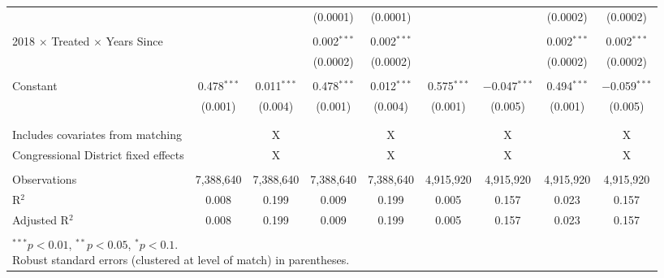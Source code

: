 \begin{table}[H]
{\begin{tabular}{@{\extracolsep{5pt}}lcccccccc}
&  &  & (0.0001) & (0.0001) &  &  & (0.0002) & (0.0002) \\
& & & & & & & & \\
2018 $\times$ Treated $\times$ Years Since &  &  & 0.002$^{***}$ & 0.002$^{***}$ &  &  & 0.002$^{***}$ & 0.002$^{***}$ \\
&  &  & (0.0002) & (0.0002) &  &  & (0.0002) & (0.0002) \\
& & & & & & & & \\
Constant & 0.478$^{***}$ & 0.011$^{***}$ & 0.478$^{***}$ & 0.012$^{***}$ & 0.575$^{***}$ & $-$0.047$^{***}$ & 0.494$^{***}$ & $-$0.059$^{***}$ \\
& (0.001) & (0.004) & (0.001) & (0.004) & (0.001) & (0.005) & (0.001) & (0.005) \\
& & & & & & & & \\
\hline \\[-1.8ex]
Includes covariates from matching &  & X &  & X &  & X &  & X \\
Congressional District fixed effects &  & X &  & X &  & X &  & X \\
\hline \\[-1.8ex]
Observations & 7,388,640 & 7,388,640 & 7,388,640 & 7,388,640 & 4,915,920 & 4,915,920 & 4,915,920 & 4,915,920 \\
R$^{2}$ & 0.008 & 0.199 & 0.009 & 0.199 & 0.005 & 0.157 & 0.023 & 0.157 \\
Adjusted R$^{2}$ & 0.008 & 0.199 & 0.009 & 0.199 & 0.005 & 0.157 & 0.023 & 0.157 \\
\hline \\[-1.8ex]
\multicolumn{9}{l}{\scriptsize{\parbox{.5\linewidth}{\vspace{2pt}$^{***}p<0.01$, $^{**}p<0.05$, $^*p<0.1$. \\Robust standard errors (clustered at level of match) in parentheses.}}}
\end{tabular}
}
\end{table}

